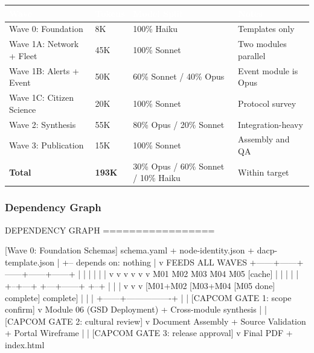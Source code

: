 \documentclass[11pt,letterpaper]{article}
\newcommand{\tableheader}[1]{\textbf{\sffamily\textcolor{white}{#1}}}
\begin{document}
\begin{center}
\begin{tabularx}{\textwidth}{L{3.5cm}C{2cm}C{2cm}X}
\toprule
{}
\tableheader{Wave} & \tableheader{Tokens} & \tableheader{Model Split} & \tableheader{Notes} \\
\midrule
Wave 0: Foundation & 8K & 100\% Haiku & Templates only \\
Wave 1A: Network + Fleet & 45K & 100\% Sonnet & Two modules parallel \\
Wave 1B: Alerts + Event & 50K & 60\% Sonnet / 40\% Opus & Event module is Opus \\
Wave 1C: Citizen Science & 20K & 100\% Sonnet & Protocol survey \\
Wave 2: Synthesis & 55K & 80\% Opus / 20\% Sonnet & Integration-heavy \\
Wave 3: Publication & 15K & 100\% Sonnet & Assembly and QA \\
\midrule
\textbf{Total} & \textbf{193K} & 30\% Opus / 60\% Sonnet / 10\% Haiku & Within target \\
\bottomrule
\end{tabularx}
\end{center}

\subsubsection{Dependency Graph}

\begin{asciibox}
DEPENDENCY GRAPH
=================

  [Wave 0: Foundation Schemas]
    schema.yaml + node-identity.json + dacp-template.json
        |
        +-- depends on: nothing
        |
        v  FEEDS ALL WAVES
  +------+------+------+------+------+
  |      |      |      |      |      |
  v      v      v      v      v      v
 M01    M02    M03    M04    M05   [cache]
  |      |      |      |      |
  +--+---+  +---+------+  +--+
     |      |                |
     v      v                v
  [M01+M02  [M03+M04      [M05 done]
  complete] complete]
     |      |                |
     +------+----------------+
            |
            |  [CAPCOM GATE 1: scope confirm]
            v
         Module 06 (GSD Deployment)
            +
         Cross-module synthesis
            |
            |  [CAPCOM GATE 2: cultural review]
            v
         Document Assembly
            +
         Source Validation
            +
         Portal Wireframe
            |
            |  [CAPCOM GATE 3: release approval]
            v
         Final PDF + index.html
\end{asciibox}
\end{document}
